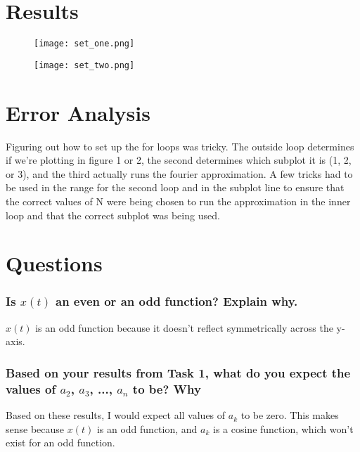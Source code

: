 \documentclass[12pt]{report}
\begin{document}
\newpage
 \section{Results}
 
\begin{multicols}{2}
\begin{figure}[H]
    \centering
    \texttt{[image: set\_one.png]}
\end{figure}

\begin{figure}[H]
    \centering
    \texttt{[image: set\_two.png]}
\end{figure}
\end{multicols}
 
 \newpage
 \section{Error Analysis}
 
Figuring out how to set up the for loops was tricky. The outside loop determines if we're plotting in figure 1 or 2, the second determines which subplot it is (1, 2, or 3), and the third actually runs the fourier approximation. A few tricks had to be used in the range for the second loop and in the subplot line to ensure that the correct values of N were being chosen to run the approximation in the inner loop and that the correct subplot was being used. 
 
 \section{Questions}
 \subsubsection{Is $x(t)$ an even or an odd function? Explain why.}
 
$x(t)$ is an odd function because it doesn't reflect symmetrically across the y-axis.
 
 \subsubsection{Based on your results from Task 1, what do you expect the values of $a_2$, $a_3$, ..., $a_n$ to be? Why}
 
Based on these results, I would expect all values of $a_k$ to be zero. This makes sense because $x(t)$ is an odd function, and $a_k$ is a cosine function, which won't exist for an odd function.
 
\end{document}
